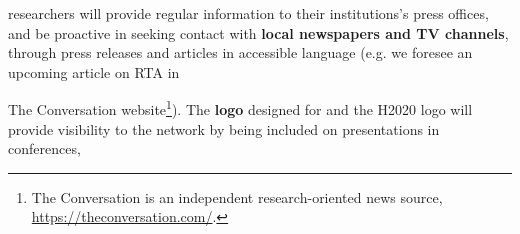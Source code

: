 \acronym researchers will provide regular information to their institutions's press offices, and be proactive in seeking contact with \textbf{local newspapers and TV channels}, through press releases and articles in accessible language (e.g. we foresee an upcoming article on RTA in {The Conversation website\footnote{The Conversation is an independent research-oriented news source, \url{https://theconversation.com/}.}). 
The \textbf{logo} designed for \acronym and the H2020 logo will provide visibility to the network by being included on presentations in conferences,

}

